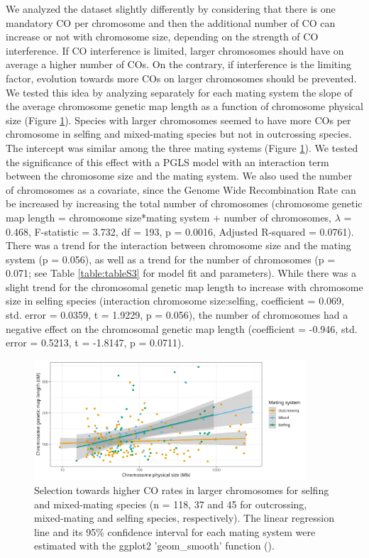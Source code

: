 \documentclass{article}
\begin{document}
We analyzed the dataset slightly differently by considering that there is one mandatory CO per chromosome and then the additional number of CO can increase or not with chromosome size, depending on the strength of CO interference. If CO interference is limited, larger chromosomes should have on average a higher number of COs. On the contrary, if interference is the limiting factor, evolution towards more COs on larger chromosomes should be prevented. We tested this idea by analyzing separately for each mating system the slope of the average chromosome genetic map length as a function of chromosome physical size (Figure \ref{figure:Fig4}). Species with larger chromosomes seemed to have more COs per chromosome in selfing and mixed-mating species but not in outcrossing species. The intercept was similar among the three mating systems (Figure \ref{figure:Fig4}). We tested the significance of this effect with a PGLS model with an interaction term between the chromosome size and the mating system. We also used the number of chromosomes as a covariate, since the Genome Wide Recombination Rate can be increased by increasing the total number of chromosomes (chromosome genetic map length = chromosome size*mating system + number of chromosomes, $\lambda$ = 0.468, F-statistic = 3.732, df = 193, p = 0.0016, Adjusted R-squared = 0.0761). There was a trend for the interaction between chromosome size and the mating system (p = 0.056), as well as a trend for the number of chromosomes (p = 0.071; see Table \ref{table:tableS3} for model fit and parameters). While there was a slight trend for the chromosomal genetic map length to increase with chromosome size in selfing species (interaction chromosome size:selfing, coefficient = 0.069, std. error = 0.0359, t = 1.9229, p = 0.056), the number of chromosomes had a negative effect on the chromosomal genetic map length (coefficient = -0.946, std. error = 0.5213, t = -1.8147, p = 0.0711).




\begin{figure}[h!]
  \includegraphics[width=0.9\textwidth]{figures/Fig4.jpeg}
  \centering
  \caption{Selection towards higher CO rates in larger chromosomes for selfing and mixed-mating species (n = 118, 37 and 45 for outcrossing, mixed-mating and selfing species, respectively). The linear regression line and its 95\% confidence interval for each mating system were estimated with the ggplot2 'geom\_smooth' function (\cite{wickhamGgplot2ElegantGraphics2016}).}
  \label{figure:Fig4}
\end{figure}
\end{document}
